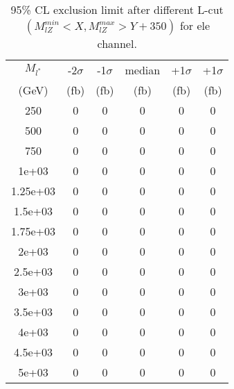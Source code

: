 \documentclass[]{article}
\begin{document}
\begin{table}
\begin{center}
\begin{tabular}{cccccc}
\hline 
\hline 
$M_{l^*}$ & -2$\sigma$ & -1$\sigma$ & median & +1$\sigma$ & +1$\sigma$\\ 
(GeV) & (fb) & (fb) & (fb) & (fb) & (fb)  \\ 
\hline 
\hline 
250 & 0 & 0 & 0 & 0 & 0\\
500 & 0 & 0 & 0 & 0 & 0\\
750 & 0 & 0 & 0 & 0 & 0\\
1e+03 & 0 & 0 & 0 & 0 & 0\\
1.25e+03 & 0 & 0 & 0 & 0 & 0\\
1.5e+03 & 0 & 0 & 0 & 0 & 0\\
1.75e+03 & 0 & 0 & 0 & 0 & 0\\
2e+03 & 0 & 0 & 0 & 0 & 0\\
2.5e+03 & 0 & 0 & 0 & 0 & 0\\
3e+03 & 0 & 0 & 0 & 0 & 0\\
3.5e+03 & 0 & 0 & 0 & 0 & 0\\
4e+03 & 0 & 0 & 0 & 0 & 0\\
4.5e+03 & 0 & 0 & 0 & 0 & 0\\
5e+03 & 0 & 0 & 0 & 0 & 0\\
\hline 
\end{tabular}
\caption{95\% CL exclusion limit after different L-cut $(M_{lZ}^{min} < X, M_{lZ}^{max} > Y + 350)$ for ele channel.}
\label{tab:limit_electron}
\end{center}
\end{table}
\end{document}
